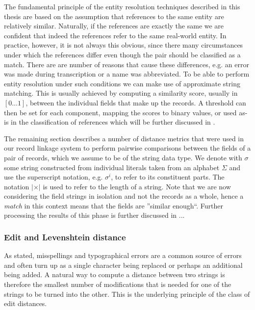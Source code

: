 \documentclass[paper=a4, fontsize=11pt]{scrartcl}
\begin{document}
The fundamental principle of the entity resolution techniques described in this thesis are based on the assumption that references to the same entity are relatively similar.
Naturally, if the references are exactly the same we are confident that indeed the references refer to the same real-world entity.
In practice, however, it is not always this obvious, since there many circumstances under which the references differ even though the pair should be classified as a match.
There are are number of reasons that cause these differences, e.g. an error was made during transcription or a name was abbreviated.
To be able to perform entity resolution under such conditions we can make use of approximate string matching.
This is usually achieved by computing a similarity score, usually in $[0 \dots 1]$, between the individual fields that make up the records.
A threshold can then be set for each component, mapping the scores to binary values, or used as-is in the classification of references which will be further discussed in .

The remaining section describes a number of distance metrics that were used in our record linkage system to perform pairwise comparisons between the fields of a pair of records, which we assume to be of the string data type.
We denote with $\sigma$ some string constructed from individual literals taken from an alphabet $\Sigma$ and use the superscript notation, e.g. $\sigma^{i}$, to refer to its constituent parts.
The notation $\vert \times \vert$ is used to refer to the length of a string.
Note that we are now considering the field strings in isolation and not the records as a whole, hence a \emph{match} in this context means that the fields are ''similar enough``.
Further processing the results of this phase is further discussed in ...

\subsubsection{Edit and Levenshtein distance}
As stated, misspellings and typographical errors are a common source of errors and often turn up as a single character being replaced or perhaps an additional being added.
A natural way to compute a distance between two strings is therefore the smallest number of modifications that is needed for one of the strings to be turned into the other.
This is the underlying principle of the class of edit distances.
\end{document}
